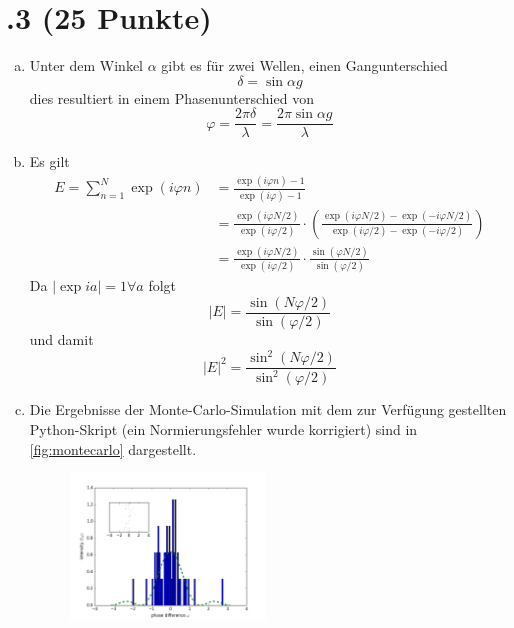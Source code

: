 \section*{\nr.3 \titthree (25 Punkte)}
\begin{enumerate}[(a)]
\item Unter dem Winkel $\alpha$ gibt es für zwei Wellen, einen Gangunterschied 
\begin{equation}
  \delta = \sin \alpha g
\end{equation}
dies resultiert in einem Phasenunterschied von
\begin{equation}
  \varphi = \frac{2 \pi \delta}{\lambda}=\frac{2 \pi \sin \alpha g}{\lambda}
\end{equation}
\item Es gilt 
\begin{align}
  E=\sum_{n=1}^N\exp\left(i\varphi n\right)&=\frac{\exp\left(i\varphi n\right) -1}{\exp\left(i \varphi\right)-1}
  \\&=\frac{\exp\left(i\varphi N/2\right)}{\exp\left(i \varphi/2\right)}\cdot \left(\frac{\exp\left(i\varphi N/2\right)-\exp\left(-i\varphi N/2\right)}{\exp\left(i\varphi /2\right)-\exp\left(-i\varphi/2\right)}\right)\\
  &=\frac{\exp\left(i\varphi N/2\right)}{\exp\left(i \varphi/2\right)}\cdot \frac{\sin\left(\varphi N/2\right)}{\sin\left(\varphi/2\right)}
\end{align}
Da $|\exp i a| = 1 \forall a$ folgt 
\begin{equation}
  |E|=\frac{\sin\left(N \varphi/2\right)}{\sin\left(\varphi/2\right)}
\end{equation}
und damit
\begin{equation}
  |E|^2=\frac{\sin^2\left(N \varphi/2\right)}{\sin^2\left(\varphi/2\right)}
\end{equation}
\item Die Ergebnisse der Monte-Carlo-Simulation mit dem zur Verfügung gestellten Python-Skript (ein Normierungsfehler wurde korrigiert) sind in \vref{fig:montecarlo} dargestellt.
\begin{figure}[htbp]
\centering
\includegraphics[width=0.49\textwidth]{50.png}

\end{figure}
\end{enumerate}
